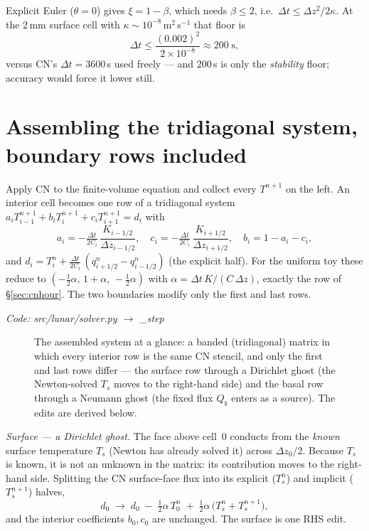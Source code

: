 \documentclass[11pt]{report}
\newcommand{\code}[1]{{\ttfamily\small #1}}
\begin{document}
Explicit Euler ($\theta=0$) gives $\xi=1-\beta$, which needs
$\beta\le2$, i.e.\ $\Delta t\le\Delta z^2/2\kappa$. At the $2$\,mm surface cell
with $\kappa\sim10^{-8}$\,m$^2$\,s$^{-1}$ that floor is
\[
\Delta t \le \frac{(0.002)^2}{2\times10^{-8}} \approx 200\;\text{s},
\]
versus CN's $\Delta t=3600$\,s used freely --- and $200$\,s is only the
\emph{stability} floor; accuracy would force it lower still.

\section{Assembling the tridiagonal system, boundary rows included}\label{app:assembly}
Apply CN to the finite-volume equation and collect every $T^{n+1}$ on the left.
An interior cell becomes one row of a tridiagonal system
$a_i T_{i-1}^{n+1}+b_i T_i^{n+1}+c_i T_{i+1}^{n+1}=d_i$ with
\[
a_i=-\tfrac{\Delta t}{2C_i}\,\frac{K_{i-1/2}}{\Delta z_{i-1/2}},\quad
c_i=-\tfrac{\Delta t}{2C_i}\,\frac{K_{i+1/2}}{\Delta z_{i+1/2}},\quad
b_i=1-a_i-c_i,
\]
and $d_i=T_i^n+\tfrac{\Delta t}{2C_i}\,(q_{i+1/2}^n-q_{i-1/2}^n)$ (the explicit
half). For the uniform toy these reduce to $(-\tfrac12\alpha,\,1+\alpha,\,
-\tfrac12\alpha)$ with $\alpha=\Delta t\,K/(C\,\Delta z)$, exactly the row of
\S\ref{sec:cnhour}. The two boundaries modify only the first and last rows.

{\small\color{dim}\textit{Code: \code{src/lunar/solver.py} $\to$ \code{\_step}}}

\begin{figure}[htbp]\centering

\caption{The assembled system at a glance: a banded (tridiagonal) matrix in
which every interior row is the same CN stencil, and only the first and last
rows differ --- the surface row through a Dirichlet ghost (the Newton-solved
$T_s$ moves to the right-hand side) and the basal row through a Neumann ghost
(the fixed flux $Q_b$ enters as a source). The edits are derived below.}
\label{fig:trimatrix}
\end{figure}

\emph{Surface --- a Dirichlet ghost.} The face above cell~0 conducts from the
\emph{known} surface temperature $T_s$ (Newton has already solved it) across
$\Delta z_0/2$. Because $T_s$ is known, it is not an unknown in the matrix: its
contribution moves to the right-hand side. Splitting the CN surface-face flux
into its explicit ($T_s^n$) and implicit ($T_s^{n+1}$) halves,
\[
d_0 \;\to\; d_0 \;-\;\tfrac12\alpha\,T_0^{n}
\;+\;\tfrac12\alpha\,\big(T_s^{n}+T_s^{n+1}\big),
\]
and the interior coefficients $b_0,c_0$ are unchanged. The surface is one RHS
edit.
\end{document}
